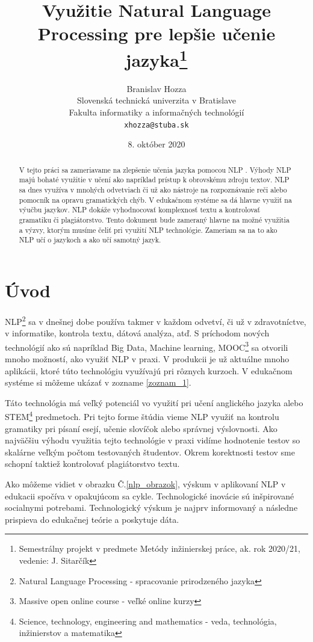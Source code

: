 \documentclass[10pt,slovak,a4paper,twoside]{article}
\title{Využitie Natural Language Processing pre lepšie učenie jazyka\thanks{Semestrálny projekt v predmete Metódy inžinierskej práce, ak. rok 2020/21, vedenie: J. Sitarčík}}
\author{Branislav Hozza\\[2pt]
	{\small Slovenská technická univerzita v Bratislave}\\
	{\small Fakulta informatiky a informačných technológií}\\
	{\small \texttt{xhozza@stuba.sk}}
	}
\date{\small 8. október 2020}
\begin{document}
\maketitle
\begin{abstract}
	V tejto práci sa zameriavame na zlepšenie učenia jazyka pomocou NLP \cite{litman2016natural}. 
	Výhody NLP majú bohaté využitie v učení ako napríklad prístup k obrovskému zdroju textov. 
	NLP sa dnes využíva v mnohých odvetviach či už ako nástroje na rozpoznávanie reči alebo pomocník na opravu gramatických chýb. 
	V edukačnom systéme sa dá hlavne využiť na výučbu jazykov. NLP dokáže vyhodnocovať komplexnosť textu a kontrolovať gramatiku či plagiátorstvo. 
	Tento dokument bude zameraný hlavne na možné využitia a výzvy, ktorým musíme čeliť pri využití NLP technológie. 
	Zameriam sa na to ako NLP učí o jazykoch a ako učí samotný jazyk.
\end{abstract}
\section{Úvod}\label{uvod}
NLP\footnote{Natural Language Processing - spracovanie prirodzeného jazyka} sa v dnešnej dobe používa takmer v každom odvetví, či už v zdravotníctve, 
v informatike, kontrola textu, dátová analýza, atď. S príchodom nových technológií ako sú napríklad Big Data, Machine learning, 
MOOC\footnote{Massive open online course - veľké online kurzy} sa otvorili mnoho možností, ako využiť NLP v praxi. 
V produkcii je už aktuálne mnoho aplikácii, ktoré túto technológiu využívajú pri rôznych kurzoch.
V edukačnom systéme si môžeme ukázať v zozname \ref{zoznam_1}.

Táto technológia má veľký potenciál vo využití pri učení anglického jazyka 
alebo STEM\footnote{Science, technology, engineering and mathematics - veda, technológia, inžinierstov a matematika} predmetoch. 
Pri tejto forme štúdia vieme NLP využiť na kontrolu gramatiky pri písaní esejí, učenie slovíčok alebo správnej výslovnosti.
Ako najväčšiu výhodu využitia tejto technológie v praxi vidíme hodnotenie testov so skalárne veľkým počtom testovaných študentov. 
Okrem korektnosti testov sme schopní taktiež kontrolovať plagiátorstvo textu.

Ako môžeme vidiet v obrazku Č.\ref{nlp_obrazok}, výskum v aplikovaní NLP v edukacii spočíva v opakujúcom sa cykle. 
Technologické inovácie sú inšpirované socialnymi potrebami. Technologický výskum je najprv informovaný a následne prispieva 
do edukačnej teórie a poskytuje dáta.
\end{document}
